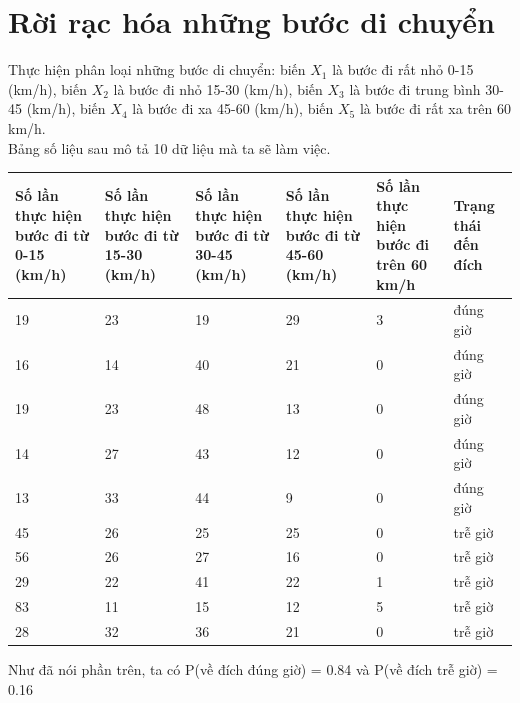 \documentclass[a4paper, 13pt]{report}
\begin{document}
\section{Rời rạc hóa những bước di chuyển}
Thực hiện phân loại những bước di chuyển: biến $X_1$ là bước đi rất nhỏ 0-15 (km/h), biến $X_2$ là bước đi nhỏ 15-30 (km/h), biến $X_3$ là bước đi trung bình 30-45 (km/h), biến $X_4$ là bước đi xa 45-60 (km/h), biến $X_5$ là bước đi rất xa trên 60 km/h.\\
Bảng số liệu sau mô tả 10 dữ liệu mà ta sẽ làm việc.
\begin{flushleft}
\begin{tabular}{|p{2.6cm}|p{2.6cm}|p{2.6cm}|p{2.6cm}|p{2.6cm}|p{1.5cm}|}
\hline
Số lần thực hiện bước đi từ 0-15 (km/h)& Số lần thực hiện bước đi từ 15-30 (km/h) & Số lần thực hiện bước đi từ 30-45 (km/h) & Số lần thực hiện bước đi từ 45-60 (km/h) & Số lần thực hiện bước đi trên 60 km/h & Trạng thái đến đích \\ 
\hline
19 & 23 & 19 & 29 & 3 & đúng giờ\\
\hline
16 & 14 & 40 & 21 & 0 & đúng giờ\\
\hline
19 & 23 & 48 & 13 & 0 & đúng giờ\\
\hline
14 & 27 & 43 & 12 & 0 & đúng giờ\\
\hline
13 & 33 & 44 & 9 & 0 & đúng giờ \\
\hline
45 & 26 & 25 & 25 & 0 & trễ giờ\\
\hline
56 & 26 & 27 & 16 & 0 & trễ giờ\\
\hline
29 & 22 & 41 & 22 & 1 & trễ giờ\\
\hline
83 & 11 & 15 & 12 & 5 & trễ giờ\\
\hline
28 & 32 & 36 & 21 & 0 & trễ giờ\\
\hline
\end{tabular}
\end{flushleft}
Như đã nói phần trên, ta có $\mathrm{P}$(về đích đúng giờ) = 0.84 và $\mathrm{P}$(về đích trễ giờ) = 0.16
\end{document}
